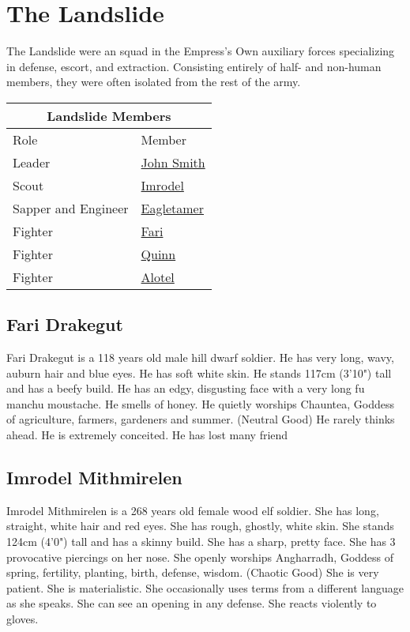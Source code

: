 \section{The Landslide}

The Landslide were an squad in the Empress's Own auxiliary forces specializing in defense, escort,
  and extraction.
Consisting entirely of half- and non-human members, they were often isolated from the rest of the
  army.

\bigskip
\begin{center}
  \begin{tabular}{|l|l|}
    \hline
    \multicolumn{2}{|c|}{Landslide Members}\\
    \hline
    Role & Member \\
    \hline
    Leader & \hyperref[sec:beez]{John Smith} \\
    Scout & \hyperref[subsec:imrodel]{Imrodel} \\
    Sapper and Engineer & \hyperref[subsec:eagletamer]{Eagletamer} \\
    Fighter & \hyperref[subsec:fari]{Fari} \\
    Fighter & \hyperref[subsec:quinn]{Quinn} \\
    Fighter & \hyperref[subsec:alotel]{Alotel} \\
    \hline
  \end{tabular}
\end{center}


\subsection{Fari Drakegut}\label{subsec:fari}
Fari Drakegut is a 118 years old male hill dwarf soldier.
He has very long, wavy, auburn hair and blue eyes.
He has soft white skin.
He stands 117cm (3'10") tall and has a beefy build.
He has an edgy, disgusting face with a very long fu manchu moustache.
He smells of honey.
He quietly worships Chauntea, Goddess of agriculture, farmers, gardeners and summer. (Neutral Good)
He rarely thinks ahead.
He is extremely conceited.
He has lost many friend

\subsection{Imrodel Mithmirelen}\label{subsec:imrodel}
Imrodel Mithmirelen is a 268 years old female wood elf soldier.
She has long, straight, white hair and red eyes.
She has rough, ghostly, white skin.
She stands 124cm (4'0") tall and has a skinny build.
She has a sharp, pretty face.
She has 3 provocative piercings on her nose.
She openly worships Angharradh, Goddess of spring, fertility, planting, birth, defense, wisdom. (Chaotic Good)
She is very patient.
She is materialistic.
She occasionally uses terms from a different language as she speaks.
She can see an opening in any defense.
She reacts violently to gloves.

